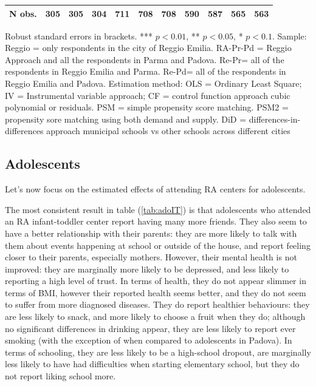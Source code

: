 \documentclass[12pt]{article}
\begin{document}
\begin{table}[ht]
\begin{center}
\begin{adjustbox}{width=1.2\textwidth,center=\textwidth}
\begin{tabular}{l*{10}{c}}
\hline
N obs. &  305 & 305 & 304 & 711 & 708 & 708 & 590 & 587 & 565 & 563 \\
\hline
\end{tabular}
\end{adjustbox}
\end{center}
\par

\vspace{1ex}
\par



{\footnotesize \raggedright{Robust standard errors in brackets. *** $p<0.01$, ** $p<0.05$, * $p<0.1$. Sample: Reggio = only respondents in the city of Reggio Emilia. RA-Pr-Pd = Reggio Approach and all the respondents in Parma and Padova. Re-Pr= all of the respondents in Reggio Emilia and Parma. Re-Pd= all of the respondents in Reggio Emilia and Padova. Estimation method: OLS = Ordinary Least Square; IV = Instrumental variable approach; CF = control function approach cubic polynomial or residuals. PSM = simple propensity score matching. PSM2 = propensity sore matching using both demand and supply. DiD = differences-in-differences approach municipal schools vs other schools across different cities} }
\end{table}


\subsection{Adolescents}
Let's now focus on the estimated effects of attending RA centers for adolescents.

The most consistent result in table (\ref{tab:adoIT}) is that adolescents who attended an RA infant-toddler center report having many more friends. They also seem to have a better relationship with their parents: they are more likely to talk with them about events happening at school or outside of the house, and report feeling closer to their parents, especially mothers. However, their mental health is not improved: they are marginally more likely to be depressed, and less likely to reporting a high level of trust. 
In terms of health, they do not appear slimmer in terms of BMI, however their reported health seems better, and they do not seem to suffer from more diagnosed diseases. They do report healthier behaviours: they are less likely to snack, and more likely to choose a fruit when they do; although no significant differences in drinking appear, they are less likely to report ever smoking (with the exception of when compared to adolescents in Padova). 
In terms of schooling, they are less likely to be a high-school dropout, are marginally less likely to have had difficulties when starting elementary school, but they do not report liking school more.
\end{document}
